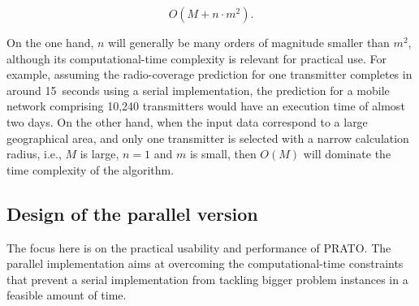 \begin{equation}
O(M+n\cdot m^{2}).
\end{equation}


\noindent On the one hand, $n$ will generally be many orders of magnitude
smaller than $m^{2}$, although its computational-time complexity
is relevant for practical use. For example, assuming the radio-coverage
prediction for one transmitter completes in around 15~seconds using
a serial implementation, the prediction for a mobile network comprising
10,240 transmitters would have an execution time of almost two days.
On the other hand, when the input data correspond to a large geographical
area, and only one transmitter is selected with a narrow calculation
radius, i.e., $M$ is large, $n=1$ and $m$ is small, then $O(M)$
will dominate the time complexity of the algorithm.


\subsection{Design of the parallel version \label{sub:04-Design_of_the_parallel_version}}

The focus here is on the practical usability and performance of PRATO.
The parallel implementation aims at overcoming the computational-time
constraints that prevent a serial implementation from tackling bigger
problem instances in a feasible amount of time.

